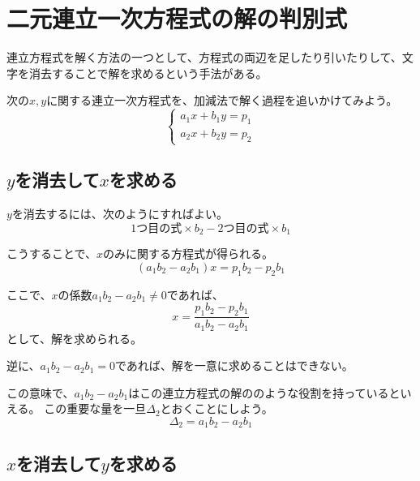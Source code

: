 \documentclass[../../../topic_linear-algebra]{subfiles}
\begin{document}
\sectionline
\section{二元連立一次方程式の解の判別式}

連立方程式を解く方法の一つとして、方程式の両辺を足したり引いたりして、文字を消去することで解を求めるという手法がある。

\br

次の$x, y$に関する連立一次方程式を、加減法で解く過程を追いかけてみよう。
\begin{equation*}
  \begin{cases}
    a_1 x + b_1 y = p_1 \\
    a_2 x + b_2 y = p_2
  \end{cases}
\end{equation*}

\subsection{$y$を消去して$x$を求める}

$y$を消去するには、次のようにすればよい。
\begin{equation*}
  \text{1つ目の式} \times b_2 - \text{2つ目の式} \times b_1
\end{equation*}

こうすることで、$x$のみに関する方程式が得られる。
\begin{equation*}
  (a_1 b_2 - a_2 b_1) x = p_1 b_2 - p_2 b_1
\end{equation*}

ここで、$x$の係数$a_1 b_2 - a_2 b_1 \neq 0$であれば、
\begin{equation*}
  x = \frac{p_1 b_2 - p_2 b_1}{a_1 b_2 - a_2 b_1}
\end{equation*}
として、解を求められる。

\br

逆に、$a_1 b_2 - a_2 b_1 = 0$であれば、解を一意に求めることはできない。

\br

この意味で、$a_1 b_2 - a_2 b_1$はこの連立方程式の解ののような役割を持っているといえる。
この重要な量を一旦$\Delta_2$とおくことにしよう。
\begin{equation*}
  \Delta_2 = a_1 b_2 - a_2 b_1
\end{equation*}

\subsection{$x$を消去して$y$を求める}
\end{document}

